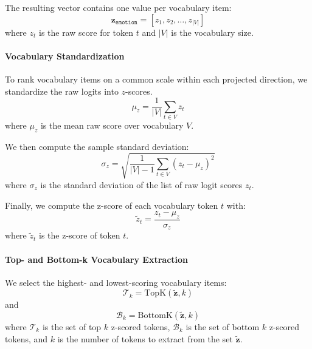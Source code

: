 The resulting vector contains one value per vocabulary item:
\begin{equation}
    \mathbf{z}_{\mathtt{emotion}}=[z_1,z_2,\dots,z_{|V|}]
    \label{eqtn:logits-set}
\end{equation}
where $z_t$ is the raw score for token $t$ and $|V|$ is the vocabulary size.

\paragraph{Vocabulary Standardization} To rank vocabulary items on a common scale within each projected direction, we standardize the raw 
logits into $z$-scores.
\begin{equation}
    \mu_z=\frac{1}{|V|}\sum_{t\in V}^{} z_t
    \label{eqtn:mean-logits}
\end{equation}
where $\mu_z$ is the mean raw score over vocabulary $V$.

We then compute the sample standard deviation:
\begin{equation}
    \sigma_z=\sqrt{\frac{1}{|V|-1}\sum_{t\in V}^{}\left(z_t-\mu_z\right)^2}
    \label{eqtn:stddev-logits}
\end{equation}
where $\sigma_z$ is the standard deviation of the list of raw logit scores $z_t$.

Finally, we compute the z-score of each vocabulary token $t$ with:
\begin{equation}
    \tilde{z}_t=\frac{z_t-\mu_z}{\sigma_z}
    \label{eqtn:bell-logits}
\end{equation}
where $\tilde{z}_t$ is the z-score of token $t$.

\paragraph{Top- and Bottom-k Vocabulary Extraction} We select the highest- and lowest-scoring vocabulary items:
\begin{equation}
    \mathcal{T}_k=\text{TopK}(\tilde{\mathbf{z}}, k)
    \label{eqtn:topk-vocabs}
\end{equation}
and
\begin{equation}
    \mathcal{B}_k=\text{BottomK}(\tilde{\mathbf{z}}, k)
    \label{eqtn:bottomk-vocabs}
\end{equation}
where $\mathcal{T}_k$ is the set of top $k$ z-scored tokens, $\mathcal{B}_k$ is the set of 
bottom $k$ z-scored tokens, and $k$ is the number of tokens to extract from the set 
$\tilde{\mathbf{z}}$.

